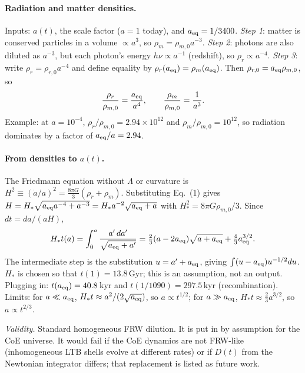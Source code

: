 \documentclass[10pt,twocolumn]{article}
\newcommand{\why}[1]{\par\noindent\textit{Validity.} #1\par}
\begin{document}
\paragraph{Radiation and matter densities.} Inputs: $a(t)$, the scale factor ($a=1$ today), and $a_{\rm eq}=1/3400$. \emph{Step 1}: matter is conserved particles in a volume $\propto a^3$, so $\rho_m=\rho_{m,0}a^{-3}$. \emph{Step 2}: photons are also diluted as $a^{-3}$, but each photon's energy $h\nu\propto a^{-1}$ (redshift), so $\rho_r\propto a^{-4}$. \emph{Step 3}: write $\rho_r=\rho_{r,0}a^{-4}$ and define equality by $\rho_r(a_{\rm eq})=\rho_m(a_{\rm eq})$. Then $\rho_{r,0}=a_{\rm eq}\rho_{m,0}$, so
\begin{equation}
\frac{\rho_r}{\rho_{m,0}}=\frac{a_{\rm eq}}{a^4},\qquad\frac{\rho_m}{\rho_{m,0}}=\frac{1}{a^3}.
\end{equation}
Example: at $a=10^{-4}$, $\rho_r/\rho_{m,0}=2.94\times10^{12}$ and $\rho_m/\rho_{m,0}=10^{12}$, so radiation dominates by a factor of $a_{\rm eq}/a=2.94$.

\paragraph{From densities to $a(t)$.} The Friedmann equation without $\Lambda$ or curvature is $H^2\equiv(\dot a/a)^2=\tfrac{8\pi G}{3}(\rho_r+\rho_m)$. Substituting Eq.~(1) gives $H=H_*\sqrt{a_{\rm eq}a^{-4}+a^{-3}}=H_*a^{-2}\sqrt{a_{\rm eq}+a}$ with $H_*^2=8\pi G\rho_{m,0}/3$. Since $dt=da/(aH)$,
\begin{equation}
H_*t(a)=\int_0^a\frac{a'\,da'}{\sqrt{a_{\rm eq}+a'}}=\tfrac23(a-2a_{\rm eq})\sqrt{a+a_{\rm eq}}+\tfrac43a_{\rm eq}^{3/2}.
\end{equation}
The intermediate step is the substitution $u=a'+a_{\rm eq}$, giving $\int(u-a_{\rm eq})u^{-1/2}du$. $H_*$ is chosen so that $t(1)=13.8$\,Gyr; this is an assumption, not an output. Plugging in: $t(a_{\rm eq})=40.8$\,kyr and $t(1/1090)=297.5$\,kyr (recombination). Limits: for $a\ll a_{\rm eq}$, $H_*t\approx a^2/(2\sqrt{a_{\rm eq}})$, so $a\propto t^{1/2}$; for $a\gg a_{\rm eq}$, $H_*t\approx\tfrac23a^{3/2}$, so $a\propto t^{2/3}$.
\why{Standard homogeneous FRW dilution. It is put in by assumption for the CoE universe. It would fail if the CoE dynamics are not FRW-like (inhomogeneous LTB shells evolve at different rates) or if $D(t)$ from the Newtonian integrator differs; that replacement is listed as future work.}
\end{document}

